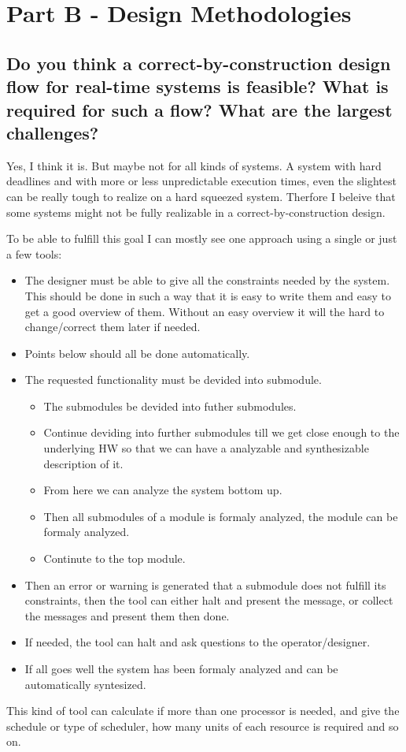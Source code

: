 \documentclass[10pt]{article}
\begin{document}
\section{Part B - Design Methodologies}

\subsection{Do you think a correct-by-construction design flow for
  real-time systems is feasible? What is required for such a flow? What
  are the largest challenges?}

Yes, I think it is. But maybe not for all kinds of systems. A system with hard deadlines and with more or less unpredictable execution times, even the slightest can be really tough to realize on a hard squeezed system. Therfore I beleive that some systems might not be fully realizable in a correct-by-construction design.

\medskip

To be able to fulfill this goal I can mostly see one approach using a single or just a few tools:
\begin{itemize}
\item The designer must be able to give all the constraints needed by the system. This should be done in such a way that it is easy to write them and easy to get a good overview of them. Without an easy overview it will the hard to change/correct them later if needed.
\item Points below should all be done automatically.
\item The requested functionality must be devided into submodule.
\begin{itemize}
\item The submodules be devided into futher submodules.
\item Continue deviding into further submodules till we get close enough to the underlying HW so that we can have a analyzable and synthesizable description of it.
\item From here we can analyze the system bottom up.
\item Then all submodules of a module is formaly analyzed, the module can be formaly analyzed.
\item Continute to the top module.
\end{itemize}
\item Then an error or warning is generated that a submodule does not fulfill its constraints, then the tool can either halt and present the message, or collect the messages and present them then done.
\item If needed, the tool can halt and ask questions to the operator/designer.
\item If all goes well the system has been formaly analyzed and can be automatically syntesized.
\end{itemize}
This kind of tool can calculate if more than one processor is needed, and give the schedule or type of scheduler, how many units of each resource is required and so on.
\end{document}
